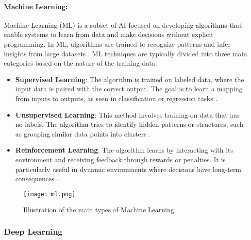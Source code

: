 \paragraph{Machine Learning:} Machine Learning (ML) is a subset of AI focused on developing algorithms that enable systems to learn from data and make decisions without explicit programming. In ML, algorithms are trained to recognize patterns and infer insights from large datasets \cite{bishop2006pattern}.
ML techniques are typically divided into three main categories based on the nature of the training data:
\begin{itemize} 
    \item \textbf{Supervised Learning}: The algorithm is trained on labeled data, where the input data is paired with the correct output. The goal is to learn a mapping from inputs to outputs, as seen in classification or regression tasks \cite{murphy2012machine}. 
    \item \textbf{Unsupervised Learning}: This method involves training on data that has no labels. The algorithm tries to identify hidden patterns or structures, such as grouping similar data points into clusters \cite{james2013introduction}. 
    \item \textbf{Reinforcement Learning}: The algorithm learns by interacting with its environment and receiving feedback through rewards or penalties. It is particularly useful in dynamic environments where decisions have long-term consequences \cite{sutton2018reinforcement}. 
\end{itemize}
\begin{figure}[H]
    \centering
    \texttt{[image: ml.png]}
    \caption{Illustration of the main types of Machine Learning.}
    \label{fig:ml}
\end{figure}

\subsubsection{Deep Learning}
